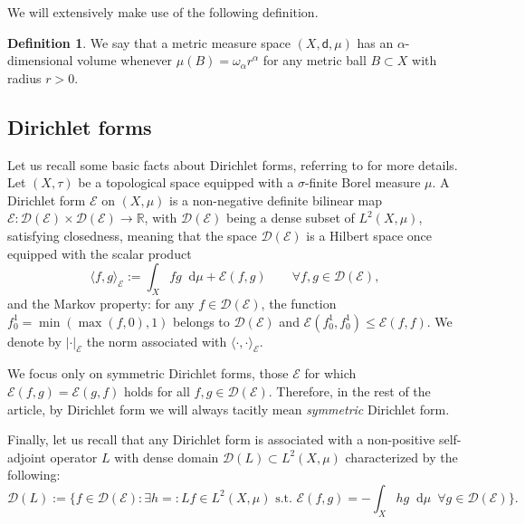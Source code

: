 \documentclass[10pt]{amsart}
\let\sep:
\theoremstyle{plain}
\theoremstyle{definition}
\newtheorem{definition}[theorem]{Definition}
\newcommand{\setR}{\mathbb{R}}
\newcommand{\cE}{\mathcal{E}}
\newcommand{\cD}{\mathcal{D}}
\newcommand{\di}{\mathop{}\!\mathrm{d}}
\newcommand{\dist}{\mathsf{d}}
\begin{document}
We will extensively make use of the following definition.

\begin{definition}
We say that a metric measure space $(X,\dist,\mu)$ has an $\alpha$-dimensional volume whenever $\mu(B)=\omega_\alpha r^\alpha$ for any metric ball $B\subset X$ with radius $r>0$.
\end{definition}

\subsection*{Dirichlet forms}

Let us recall some basic facts about Dirichlet forms, referring to \eg \cite{FukushimaOshidaTakeda, Sturm1, KoskelaZhou} for more details. Let $(X,\tau)$ be a topological space equipped with a $\sigma$-finite Borel measure $\mu$. A Dirichlet form $\cE$ on $(X,\mu)$ is a non-negative definite bilinear map $\cE: \cD(\cE) \times \cD(\cE) \to \setR$, with $\cD(\cE)$ being a dense subset of $L^2(X,\mu)$, satisfying closedness, meaning that the space $\cD(\cE)$ is a Hilbert space once equipped with the scalar product
\begin{equation}\label{eq:scalE}
\langle f, g \rangle_{\cE}:= \int_{X} f g \di \mu + \cE(f,g)\qquad \forall f, g \in \cD(\cE),
\end{equation}
and the Markov property: for any $f \in \cD(\cE)$, the function $f_{0}^{1} = \min (\max(f,0),1)$ belongs to $\cD(\cE)$ and $\cE(f_{0}^{1},f_{0}^{1}) \le \cE(f,f)$. We denote by $|\cdot|_\cE$ the norm associated with $\langle \cdot, \cdot \rangle_\cE$.

We focus only on symmetric Dirichlet forms, \ie those $\cE$ for which $\cE(f,g)=\cE(g,f)$ holds for all $f,g \in \cD(\cE)$. Therefore, in the rest of the article, by Dirichlet form we will always tacitly mean \textit{symmetric} Dirichlet form.

Finally, let us recall that any Dirichlet form is associated with a non-positive self-adjoint operator $L$ with dense domain $\cD(L) \subset L^2(X,\mu)$ characterized by the following:
\[
\cD(L):=\biggl\{f \in \cD(\cE) \sep \exists h=:Lf \in L^2(X,\mu)\, \, \text{s.t.}\, \, \cE(f,g)= -\int_X h g \di \mu \, \, \, \forall g \in \cD(\cE)\biggr\}.
\]
\end{document}
